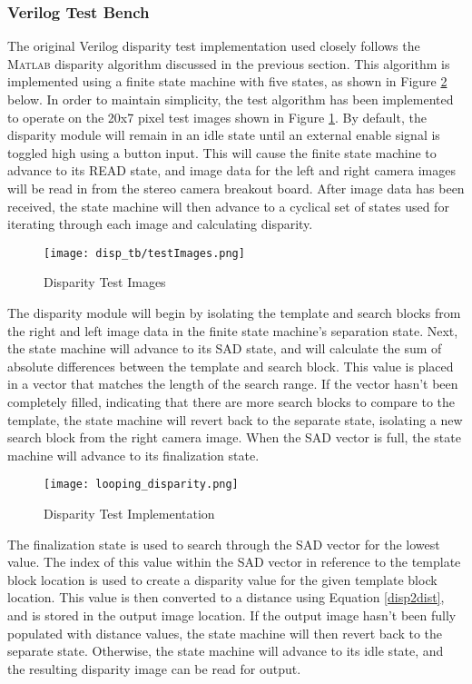 \subsubsection{Verilog Test Bench}
The original Verilog disparity test implementation used closely follows the \textsc{Matlab} disparity algorithm discussed in the previous section. This algorithm is implemented using a finite state machine with five states, as shown in Figure \ref{disparityTestImp} below. In order to maintain simplicity, the test algorithm has been implemented to operate on the 20x7 pixel test images shown in Figure \ref{disparityTestImg}. By default, the disparity module will remain in an idle state until an external enable signal is toggled high using a button input. This will cause the finite state machine to advance to its READ state, and image data for the left and right camera images will be read in from the stereo camera breakout board. After image data has been received, the state machine will then advance to a cyclical set of states used for iterating through each image and calculating disparity. 
\par
\begin{figure}[H]
	\centerline{\texttt{[image: disp\_tb/testImages.png]}}
	\caption{Disparity Test Images}
	\label{disparityTestImg}
\end{figure}
The disparity module will begin by isolating the template and search blocks from the right and left image data in the finite state machine's separation state. Next, the state machine will advance to its SAD state, and will calculate the sum of absolute differences between the template and search block. This value is placed in a vector that matches the length of the search range. If the vector hasn't been completely filled, indicating that there are more search blocks to compare to the template, the state machine will revert back to the separate state, isolating a new search block from the right camera image. When the SAD vector is full, the state machine will advance to its finalization state. 
\par
\begin{figure}[H]
	\centerline{\texttt{[image: looping\_disparity.png]}}
	\caption{Disparity Test Implementation}
	\label{disparityTestImp}
\end{figure}
\par
The finalization state is used to search through the SAD vector for the lowest value. The index of this value within the SAD vector in reference to the template block location is used to create a disparity value for the given template block location. This value is then converted to a distance using Equation \ref{disp2dist}, and is stored in the output image location. If the output image hasn't been fully populated with distance values, the state machine will then revert back to the separate state. Otherwise, the state machine will advance to its idle state, and the resulting disparity image can be read for output. 
